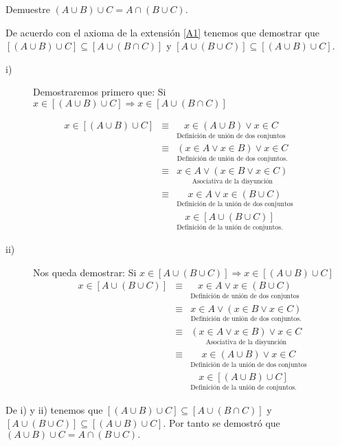 \propo  Demuestre $\left(A\cup B\right)\cup C=A\cap\left(B\cup C\right).$

\begin{prueba} De acuerdo con el axioma de la extensión \ref{A1}
tenemos que demostrar que $\left[\left(A\cup B\right)\cup C\right]\subseteq\left[A\cup\left(B\cap C\right)\right]$
y $\left[A\cup\left(B\cup C\right)\right]\subseteq\left[\left(A\cup B\right)\cup C\right].$
\begin{description}
\item [{i)}] Demostraremos primero que: Si $x\in\left[\left(A\cup B\right)\cup C\right]\Rightarrow x\in\left[A\cup\left(B\cap C\right)\right]$
\end{description}
\begin{eqnarray*}
x\in\left[\left(A\cup B\right)\cup C\right] & \equiv & \underset{\mbox{Definición de unión de dos conjuntos}}{x\in\left(A\cup B\right)\vee x\in C}\\
 & \equiv & \underset{\mbox{Definición de unión de dos conjuntos.}}{\left(x\in A\vee x\in B\right)\vee x\in C}\\
 & \equiv & \underset{\mbox{Asociativa de la disyunción}}{x\in A\vee\left(x\in B\vee x\in C\right)}\\
 & \equiv & \underset{\mbox{Definición de la unión de dos conjuntos}}{x\in A\vee x\in\left(B\cup C\right)}\\
 &  & \underset{\mbox{Definición de la unión de conjuntos.}}{x\in\left[A\cup\left(B\cup C\right)\right]}
\end{eqnarray*}

\begin{description}
\item [{ii)}] Nos queda demostrar: Si $x\in\left[A\cup\left(B\cup C\right)\right]\Rightarrow x\in\left[\left(A\cup B\right)\cup C\right]$
\begin{eqnarray*}
x\in\left[A\cup\left(B\cup C\right)\right] & \equiv & \underset{\mbox{Definición de unión de dos conjuntos}}{x\in A\vee x\in\left(B\cup C\right)}\\
 & \equiv & \underset{\mbox{Definición de unión de dos conjuntos.}}{x\in A\vee\left(x\in B\vee x\in C\right)}\\
 & \equiv & \underset{\mbox{Asociativa de la disyunción}}{\left(x\in A\vee x\in B\right)\vee x\in C}\\
 & \equiv & \underset{\mbox{Definición de la unión de dos conjuntos}}{x\in\left(A\cup B\right)\vee x\in C}\\
 &  & \underset{\mbox{Definición de la unión de conjuntos.}}{x\in\left[\left(A\cup B\right)\cup C\right]}
\end{eqnarray*}
\end{description}
De i) y ii) tenemos que $\left[\left(A\cup B\right)\cup C\right]\subseteq\left[A\cup\left(B\cap C\right)\right]$
y $\left[A\cup\left(B\cup C\right)\right]\subseteq\left[\left(A\cup B\right)\cup C\right].$
Por tanto se demostró que $\left(A\cup B\right)\cup C=A\cap\left(B\cup C\right).$

\end{prueba}

